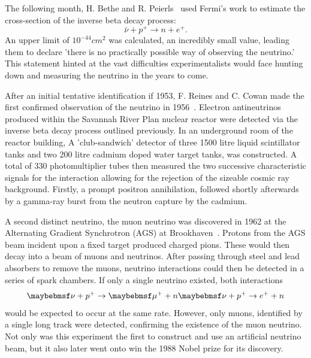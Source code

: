 The following month, H. Bethe and R. Peierls~\cite{bethe1934} used Fermi's work to estimate the
cross-section of the inverse beta decay process:
\begin{equation} %
    \bar{\nu} + p^{+} \rightarrow n + e^{+}.
\end{equation} %
An upper limit of $10^{-44} cm^2$ was calculated, an incredibly small value, leading them to
declare 'there is no practically possible way of observing the neutrino.' This statement hinted at
the vast difficulties experimentalists would face hunting down and measuring the neutrino in the
years to come.

After an initial tentative identification if 1953, F. Reines and C. Cowan made the first confirmed
observation of the neutrino in 1956~\cite{cowan1956}. Electron antineutrinos produced within the
Savannah River Plan nuclear reactor were detected via the inverse beta decay process outlined
previously. In an underground room of the reactor building, A 'club-sandwich' detector of three
1500 litre liquid scintillator tanks and two 200 litre cadmium doped water target tanks, was
constructed. A total of 330 photomultiplier tubes then measured the two successive characteristic
signals for the interaction allowing for the rejection of the sizeable cosmic ray background.
Firstly, a prompt positron annihilation, followed shortly afterwards by a gamma-ray burst from the
neutron capture by the cadmium.

A second distinct neutrino, the muon neutrino was discovered in 1962 at the Alternating Gradient
Synchrotron (AGS) at Brookhaven~\cite{danby1962}. Protons from the AGS beam incident upon a fixed
target produced charged pions. These would then decay into a beam of muons and neutrinos. After
passing through steel and lead absorbers to remove the muons, neutrino interactions could then be
detected in a series of spark chambers. If only a single neutrino existed, both interactions
\begin{equation} %
    \nu+p^{+}\rightarrow\mu^{+}+n \\
    \nu+p^{+}\rightarrow e^{+}+n
\end{equation} %
would be expected to occur at the same rate. However, only muons, identified by a single long
track were detected, confirming the existence of the muon neutrino. Not only was this experiment
the first to construct and use an artificial neutrino beam, but it also later went onto win the
1988 Nobel prize for its discovery.

